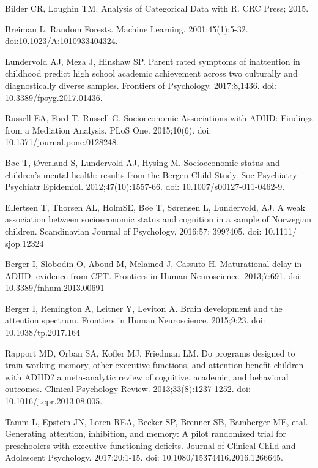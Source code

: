 \documentclass[10pt,letterpaper]{article}
\begin{document}
{\begin{thebibliography}{vancouver.bst}
Bilder CR,  Loughin TM.
\newblock Analysis of Categorical Data with R.
\newblock CRC Press; 2015.

Breiman L.
\newblock Random Forests. 
\newblock Machine Learning. 2001;45(1):5-32. doi:10.1023/A:1010933404324.

Lundervold  AJ, Meza J, Hinshaw SP.
\newblock Parent rated symptoms of inattention in childhood predict high school academic achievement across two culturally and diagnostically diverse samples.
\newblock Frontiers of Psychology. 2017:8,1436. doi: 10.3389/fpsyg.2017.01436.

Russell EA, Ford T, Russell G.
\newblock Socioeconomic Associations with ADHD: Findings from a Mediation Analysis.
\newblock PLoS One. 2015;10(6). doi: 10.1371/journal.pone.0128248. 

B\o{}e T, \O{}verland S, Lundervold AJ, Hysing M.
\newblock Socioeconomic status and children's mental health: results from the Bergen Child Study.
\newblock Soc Psychiatry Psychiatr Epidemiol. 2012;47(10):1557-66. doi: 10.1007/s00127-011-0462-9. 

Ellertsen T, Thorsen AL, HolmSE, B\o{}e T, S\o{}rensen L, Lundervold,
AJ.
\newblock A weak association between socioeconomic status and cognition
in a sample of Norwegian children. 
\newblock Scandinavian Journal of Psychology, 2016;57: 399?405. doi: 10.1111/
sjop.12324
  
Berger I, Slobodin O, Aboud M, Melamed J, Cassuto H.
\newblock Maturational delay in {ADHD}: evidence from {CPT}.
\newblock Frontiers in Human Neuroscience. 2013;7:691. doi: 10.3389/fnhum.2013.00691

Berger I, Remington A, Leitner Y, Leviton A.
\newblock Brain development and the attention spectrum.
\newblock Frontiers in Human Neuroscience. 2015;9:23. doi: 10.1038/tp.2017.164

Rapport MD, Orban SA, Kofler MJ, Friedman LM.
\newblock Do programs designed to train working memory, other executive
  functions, and attention benefit children with {ADHD}? a meta-analytic review
  of cognitive, academic, and behavioral outcomes.
\newblock Clinical Psychology Review. 2013;33(8):1237-1252. doi: 10.1016/j.cpr.2013.08.005.

Tamm L, Epstein JN, Loren REA, Becker SP, Brenner SB, Bamberger ME, etal.
\newblock Generating attention, inhibition, and memory: A pilot randomized
  trial for preschoolers with executive functioning deficits.
\newblock Journal of Clinical Child and Adolescent Psychology. 2017;20:1-15. doi: 10.1080/15374416.2016.1266645. 


\end{thebibliography}}
\end{document}
